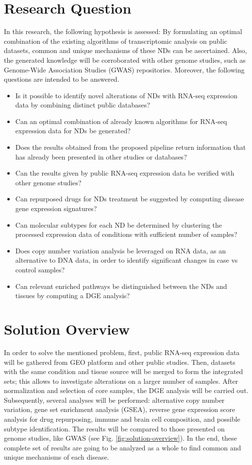 \section{Research Question}
In this research, the following hypothesis is assessed: By formulating an optimal combination of the existing algorithms of transcriptomic analysis on public datasets, common and unique mechanisms of these NDs can be ascertained. Also, the generated knowledge will be corroborated with other genome studies, such as Genome-Wide Association Studies (GWAS) repositories. Moreover, the following questions are intended to be answered.

\begin{itemize}
\item Is it possible to identify novel alterations of NDs with RNA-seq expression data by combining distinct public databases?
\item Can an optimal combination of already known algorithms for RNA-seq expression data for NDs be generated?
\item Does the results obtained from the proposed pipeline return information that has already been presented in other studies or databases?  
\item Can the results given by public RNA-seq expression data be verified with other genome studies?
\item Can repurposed drugs for NDs treatment be suggested by computing disease gene expression signatures?
\item Can molecular subtypes for each ND be determined by clustering the processed expression data of conditions with sufficient number of samples?
\item Does copy number variation analysis be leveraged on RNA data, as an alternative to DNA data, in order to identify significant changes in case vs control samples?
\item Can relevant enriched pathways be distinguished between the NDs and tissues by computing a DGE analysis?
\end{itemize}

\section{Solution Overview}
In order to solve the mentioned problem, first, public RNA-seq expression data will be gathered from GEO platform and other public studies. Then, datasets with the same condition and tissue source will be merged to form the integrated sets; this allows to investigate alterations on a larger number of samples. After normalization and selection of core samples, the DGE analysis will be carried out. Subsequently, several analyses will be performed: alternative copy number variation, gene set enrichment analysis (GSEA), reverse gene expression score analysis for drug repurposing, immune and brain cell composition, and possible subtype identification. The results will be compared to those presented on genome studies, like GWAS (see Fig. \ref{fig:solution-overview}). In the end, these complete set of results are going to be analyzed as a whole to find common and unique mechanisms of each disease.

